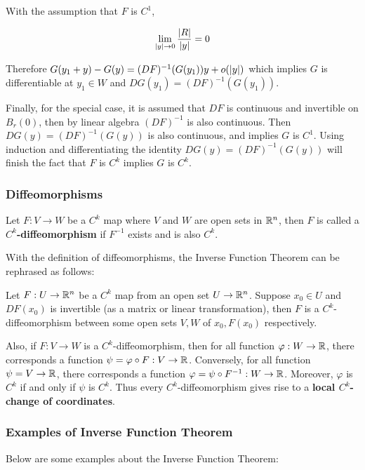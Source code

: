 \documentclass[a4paper,12pt]{article}
\begin{document}
\begin{thm}
  With the assumption that $F$ is $C^{1}$,

  $$\lim_{\left| y\right|\to 0}\frac{\left| R\right|}{\left| y\right|}=0$$\s

  Therefore $G(y_{1}+y)-G(y)=(DF)^{-1}(G(y_{1}))y+o(\left| y\right|)$ which implies $G$ is differentiable at $y_{1}\in W$ and $DG(y_{1})=(DF)^{-1}(G(y_{1}))$.\n

  Finally, for the special case, it is assumed that $DF$ is continuous and invertible on $B_{r}(0)$, then by linear algebra $(DF)^{-1}$ is also continuous. Then $DG(y)=(DF)^{-1}(G(y))$ is also continuous, and implies $G$ is $C^{1}$. Using induction and differentiating the identity $DG(y)=(DF)^{-1}(G(y))$ will finish the fact that $F$ is $C^{k}$ implies $G$ is $C^{k}$.
\end{thm}\n

\subsubsection{Diffeomorphisms}
\begin{dft}
  Let $F:V\to W$ be a $C^{k}$ map where $V$ and $W$ are open sets in $\mathbb{R}^{n}$, then $F$ is called a \textbf{$C^{k}$-diffeomorphism} if $F^{-1}$ exists and is also $C^{k}$.
\end{dft}\n

With the definition of diffeomorphisms, the Inverse Function Theorem can be rephrased as follows:

\begin{thm}
  Let $F:U\to\mathbb{R}^{n}$ be a $C^{k}$ map from an open set $U\to\mathbb{R}^{n}$. Suppose $x_{0}\in U$ and $DF(x_{0})$ is invertible (as a matrix or linear transformation), then $F$ is a $C^{k}$-diffeomorphism between some open sets $V,W$ of $x_{0},F(x_{0})$ respectively.
\end{thm}\n

Also, if $F:V\to W$ is a $C^{k}$-diffeomorphism, then for all function $\varphi:W\to\mathbb{R}$, there corresponds a function $\psi=\varphi\circ F:V\to\mathbb{R}$. Conversely, for all function $\psi=V\to\mathbb{R}$, there corresponds a function $\varphi=\psi\circ F^{-1}:W\to\mathbb{R}$. Moreover, $\varphi$ is $C^{k}$ if and only if $\psi$ is $C^{k}$. Thus every $C^{k}$-diffeomorphism gives rise to a \textbf{local $C^{k}$-change of coordinates}.

\subsubsection{Examples of Inverse Function Theorem}
Below are some examples about the Inverse Function Theorem:\n
\end{document}
